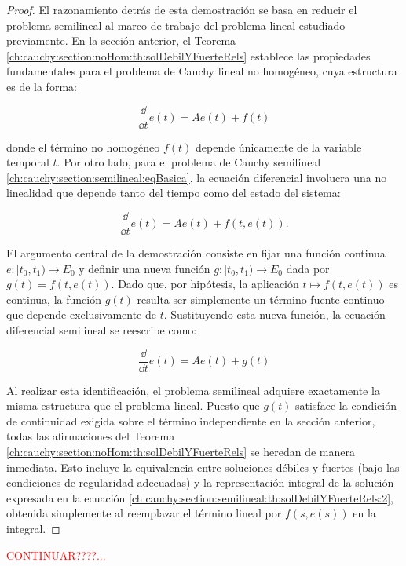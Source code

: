 \begin{proof}
    El razonamiento detrás de esta demostración se basa en reducir el problema semilineal al marco de trabajo del problema lineal estudiado previamente. En la sección anterior, el Teorema \eqref{ch:cauchy:section:noHom:th:solDebilYFuerteRels} establece las propiedades fundamentales para el problema de Cauchy lineal no homogéneo, cuya estructura es de la forma:
    
    \[\frac{\dd}{\dd t}e(t) = Ae(t) + f(t)\]
    
    donde el término no homogéneo $f(t)$ depende únicamente de la variable temporal $t$. Por otro lado, para el problema de Cauchy semilineal \eqref{ch:cauchy:section:semilineal:eqBasica}, la ecuación diferencial involucra una no linealidad que depende tanto del tiempo como del estado del sistema:
    
    \[\frac{\dd}{\dd t}e(t) = Ae(t) + f(t, e(t)).\]
    
    El argumento central de la demostración consiste en fijar una función continua $e: [t_0, t_1) \to E_0$ y definir una nueva función $g: [t_0, t_1) \to E_0$ dada por $g(t) = f(t, e(t))$. Dado que, por hipótesis, la aplicación $t \mapsto f(t, e(t))$ es continua, la función $g(t)$ resulta ser simplemente un término fuente continuo que depende exclusivamente de $t$. Sustituyendo esta nueva función, la ecuación diferencial semilineal se reescribe como:
    
    \[\frac{\dd}{\dd t}e(t) = Ae(t) + g(t)\]
    
    Al realizar esta identificación, el problema semilineal adquiere exactamente la misma estructura que el problema lineal. Puesto que $g(t)$ satisface la condición de continuidad exigida sobre el término independiente en la sección anterior, todas las afirmaciones del Teorema \eqref{ch:cauchy:section:noHom:th:solDebilYFuerteRels} se heredan de manera inmediata. Esto incluye la equivalencia entre soluciones débiles y fuertes (bajo las condiciones de regularidad adecuadas) y la representación integral de la solución expresada en la ecuación \eqref{ch:cauchy:section:semilineal:th:solDebilYFuerteRels:2}, obtenida simplemente al reemplazar el término lineal por $f(s, e(s))$ en la integral.
\end{proof}

\textcolor{red}{CONTINUAR????...}